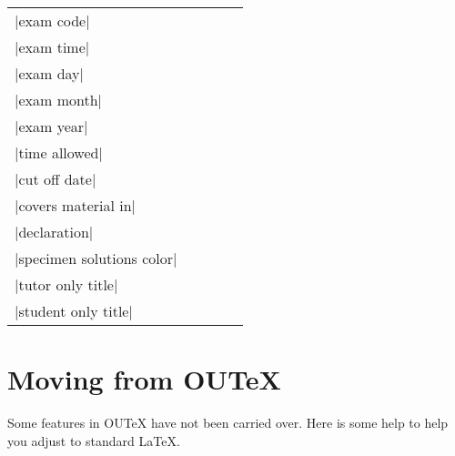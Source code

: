 \documentclass[a4paper]{ltxguide}
\newcommand\3{\unskip\enspace\fbox{\fontsize{4}{4}\selectfont NEW 3.0}}
\newcommand{\metakeyavailable}{\textbullet}
\begin{document}
\begin{longtable}{lcccc}
	|exam code|                   &                   & \metakeyavailable &                   &                   \\
	|exam time|                   &                   & \metakeyavailable &                   &                   \\
	|exam day|                    &                   & \metakeyavailable &                   &                   \\
	|exam month|                  &                   & \metakeyavailable &                   &                   \\
	|exam year|                   &                   & \metakeyavailable &                   &                   \\
	|time allowed|                &                   & \metakeyavailable &                   &                   \\
	|cut off date|                &                   &                   & \metakeyavailable &                   \\
	|covers material in|          &                   &                   & \metakeyavailable &                   \\
	|declaration|                 &                   &                   & \metakeyavailable &                   \\
	|specimen solutions color|    &                   &                   &                   & \metakeyavailable \\
	|tutor only title|            &                   &                   &                   & \metakeyavailable \\
	|student only title|          &                   &                   &                   & \metakeyavailable \\
	\bottomrule
\end{longtable}
\pagebreak
\section{Moving from OUTeX}

Some features in OUTeX have not been carried over. Here is some help to help you adjust to standard \LaTeX.
\end{document}
